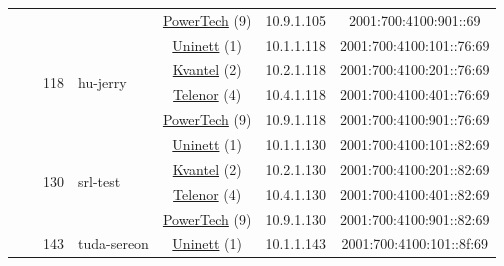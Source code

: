\begin{small}
\begin{center}
\begin{longtable}{|c|c|c|c|c|c|c|c|}
  &  & \multicolumn{2}{|c|}{} & \multicolumn{2}{|c|}{\tiny{\href{http://www.powertech.no}{PowerTech} (9)}} & \tiny{10.9.1.105} & \tiny{2001:700:4100:901::69} \\* \cline{3-3}\cline{4-4}\cline{5-5}\cline{6-6}\cline{7-7}\cline{8-8}
  &  & \multirow{4}{*}{\tiny{118}} & \multicolumn{1}{|l|}{\multirow{4}{*}{\tiny{hu-jerry}}} & \multicolumn{2}{|c|}{\tiny{\href{https://www.uninett.no}{Uninett} (1)}} & \tiny{10.1.1.118} & \tiny{2001:700:4100:101::76:69} \\* \cline{5-5}\cline{6-6}\cline{7-7}\cline{8-8}
  &  &  &  & \multicolumn{2}{|c|}{\tiny{\href{http://kvantel.no}{Kvantel} (2)}} & \tiny{10.2.1.118} & \tiny{2001:700:4100:201::76:69} \\* \cline{5-5}\cline{6-6}\cline{7-7}\cline{8-8}
  &  &  &  & \multicolumn{2}{|c|}{\tiny{\href{https://www.telenor.no}{Telenor} (4)}} & \tiny{10.4.1.118} & \tiny{2001:700:4100:401::76:69} \\* \cline{5-5}\cline{6-6}\cline{7-7}\cline{8-8}
  &  &  &  & \multicolumn{2}{|c|}{\tiny{\href{http://www.powertech.no}{PowerTech} (9)}} & \tiny{10.9.1.118} & \tiny{2001:700:4100:901::76:69} \\* \cline{3-3}\cline{4-4}\cline{5-5}\cline{6-6}\cline{7-7}\cline{8-8}
  &  & \multirow{4}{*}{\tiny{130}} & \multicolumn{1}{|l|}{\multirow{4}{*}{\tiny{srl-test}}} & \multicolumn{2}{|c|}{\tiny{\href{https://www.uninett.no}{Uninett} (1)}} & \tiny{10.1.1.130} & \tiny{2001:700:4100:101::82:69} \\* \cline{5-5}\cline{6-6}\cline{7-7}\cline{8-8}
  &  &  &  & \multicolumn{2}{|c|}{\tiny{\href{http://kvantel.no}{Kvantel} (2)}} & \tiny{10.2.1.130} & \tiny{2001:700:4100:201::82:69} \\* \cline{5-5}\cline{6-6}\cline{7-7}\cline{8-8}
  &  &  &  & \multicolumn{2}{|c|}{\tiny{\href{https://www.telenor.no}{Telenor} (4)}} & \tiny{10.4.1.130} & \tiny{2001:700:4100:401::82:69} \\* \cline{5-5}\cline{6-6}\cline{7-7}\cline{8-8}
  &  &  &  & \multicolumn{2}{|c|}{\tiny{\href{http://www.powertech.no}{PowerTech} (9)}} & \tiny{10.9.1.130} & \tiny{2001:700:4100:901::82:69} \\* \cline{3-3}\cline{4-4}\cline{5-5}\cline{6-6}\cline{7-7}\cline{8-8}
  &  & \multirow{4}{*}{\tiny{143}} & \multicolumn{1}{|l|}{\multirow{4}{*}{\tiny{tuda-sereon}}} & \multicolumn{2}{|c|}{\tiny{\href{https://www.uninett.no}{Uninett} (1)}} & \tiny{10.1.1.143} & \tiny{2001:700:4100:101::8f:69} \\* \cline{5-5}\cline{6-6}\cline{7-7}\cline{8-8}

\end{longtable}
\end{center}
\end{small}
